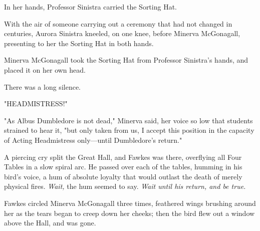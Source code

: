In her hands, Professor Sinistra carried the Sorting Hat.

With the air of someone carrying out a ceremony that had not changed in
centuries, Aurora Sinistra kneeled, on one knee, before Minerva McGonagall,
presenting to her the Sorting Hat in both hands.

Minerva McGonagall took the Sorting Hat from Professor Sinistra's hands, and
placed it on her own head.

There was a long silence.

"HEADMISTRESS!"

"As Albus Dumbledore is not dead," Minerva said, her voice so low that students
strained to hear it, "but only taken from us, I accept this position in the
capacity of Acting Headmistress only---until Dumbledore's return."

A piercing cry split the Great Hall, and Fawkes was there, overflying all Four
Tables in a slow spiral arc. He passed over each of the tables, humming in his
bird's voice, a hum of absolute loyalty that would outlast the death of merely
physical fires. \emph{Wait,} the hum seemed to say. \emph{Wait until his
return, and be true.}

Fawkes circled Minerva McGonagall three times, feathered wings brushing around
her as the tears began to creep down her cheeks; then the bird flew out a
window above the Hall, and was gone.
